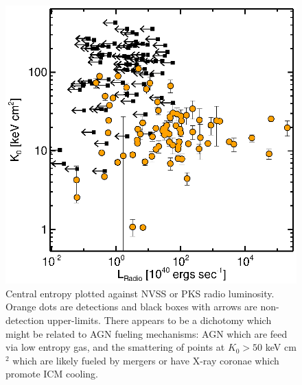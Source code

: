 \documentclass[11pt]{article}
\begin{document}
\begin{figure}[t]
\begin{minipage}[t]{0.5\linewidth}
        \includegraphics*[width=\textwidth, trim=28mm 8mm 30mm 10mm, clip]{rad}
        \caption{\small Central entropy plotted against NVSS or PKS radio
        luminosity. Orange dots are detections and black boxes with
        arrows are non-detection upper-limits. There appears to be a dichotomy which might be related to AGN
        fueling mechanisms: AGN which are feed via low entropy gas, and the
        smattering of points at $K_0 > 50$ keV cm$^2$ which are likely
        fueled by mergers or have X-ray coronae which promote ICM cooling.}
        \label{fig:rad}
    \end{minipage}
\end{figure}
 
\end{document}
